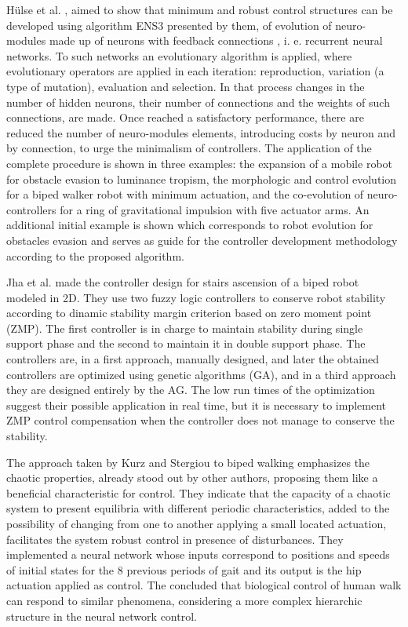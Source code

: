 Hülse et al. \cite{Huelse04Structure}, aimed to show that minimum and
robust control structures can be developed using algorithm ENS3
presented by them, of evolution of neuro-modules made up of neurons
with feedback connections , i. e. recurrent neural networks. To such
networks an evolutionary algorithm is applied, where evolutionary
operators are applied in each iteration: reproduction, variation (a
type of mutation), evaluation and selection. In that process changes
in the number of hidden neurons, their number of connections and the
weights of such connections, are made. Once reached a satisfactory
performance, there are reduced the number of neuro-modules elements,
introducing costs by neuron and by connection, to urge the minimalism
of controllers. The application of the complete procedure is shown in
three examples: the expansion of a mobile robot for obstacle evasion
to luminance tropism, the morphologic and control evolution for a
biped walker robot with minimum actuation, and the co-evolution of
neuro-controllers for a ring of gravitational impulsion with five
actuator arms. An additional initial example is shown which
corresponds to robot evolution for obstacles evasion and serves as
guide for the controller development methodology according to the
proposed algorithm.


Jha et al. \cite{Jha05On-line} made the controller design for stairs
ascension of a biped robot modeled in 2D. They use two fuzzy logic
controllers to conserve robot stability according to dinamic stability
margin criterion based on zero moment point (ZMP). The first
controller is in charge to maintain stability during single support
phase and the second to maintain it in double support phase. The
controllers are, in a first approach, manually designed, and later the
obtained controllers are optimized using genetic algorithms (GA), and
in a third approach they are designed entirely by the AG. The low run
times of the optimization suggest their possible application in real
time, but it is necessary to implement ZMP control compensation when
the controller does not manage to conserve the stability.


The approach taken by Kurz and Stergiou \cite{Kurz05artificial} to
biped walking emphasizes the chaotic properties, already stood out by
other authors, proposing them like a beneficial characteristic for
control. They indicate that the capacity of a chaotic system to
present equilibria with different periodic characteristics, added to
the possibility of changing from one to another applying a small
located actuation, facilitates the system robust control in presence
of disturbances. They implemented a neural network whose inputs
correspond to positions and speeds of initial states for the 8
previous periods of gait and its output is the hip actuation applied
as control. The concluded that biological control of human walk can
respond to similar phenomena, considering a more complex hierarchic
structure in the neural network control.


